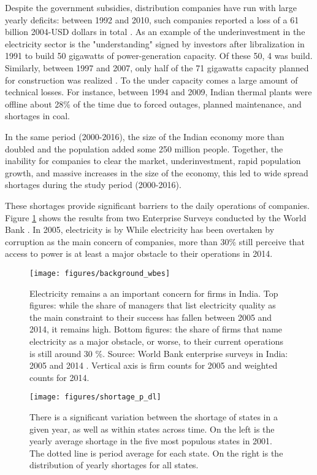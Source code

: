 \documentclass[11pt]{article}
\begin{document}
Despite the government subsidies, distribution companies have run with large yearly deficits: between 1992 and 2010, such companies reported a loss of a 61 billion 2004-USD dollars in total \citep{allcott_how_2016}. As an example of the underinvestment in the electricity sector is the "understanding" signed by investors after libralization in 1991 to build 50 gigawatts of power-generation capacity. Of these 50, 4 was build. Similarly, between 1997 and 2007, only half of the 71 gigawatts capacity planned for construction was realized \citep{cea_planwise_2013}. To the under capacity comes a large amount of technical losses. For instance, between 1994 and 2009, Indian thermal plants were offline about 28\% of the time due to forced outages, planned maintenance, and shortages in coal. 

In the same period (2000-2016), the size of the Indian economy more than doubled and the population added some 250 million people. Together, the inability for companies to clear the market, underinvestment, rapid population growth, and massive increases in the size of the economy, this led to wide spread shortages during the study period (2000-2016). 

These shortages provide significant barriers to the daily operations of companies. Figure \ref{fig:biggest_obstacle} shows the results from two Enterprise Surveys conducted by the World Bank \citep{world_bank_enterprise_2020-1,world_bank_enterprise_2020-2}. In 2005, electricity is by  While electricity has been overtaken by corruption as the main concern of companies, more than 30\% still perceive that access to power is at least a major obstacle to their operations in 2014.

\begin{figure}[htpb]
	\centering
	\texttt{[image: figures/background\_wbes]}
	\caption{Electricity remains a an important concern for firms in India. Top figures: while the share of managers that list electricity quality as the main constraint to their success has fallen between 2005 and 2014, it remains high. Bottom figures: the share of firms that name electricity as a major obstacle, or worse, to their current operations is still around 30 \%. Source: World Bank enterprise surveys in India: 2005 and 2014 \citep{world_bank_enterprise_2020-2,world_bank_enterprise_2020-1}. Vertical axis is firm counts for 2005 and weighted counts for 2014.}
	\label{fig:biggest_obstacle}
\end{figure}

\begin{figure}[htpb]
	\centering
	\label{fig:shortage_p_dl}
	\texttt{[image: figures/shortage\_p\_dl]}
	\caption{There is a significant variation between the shortage of states in a given year, as well as within states across time. On the left is the yearly average shortage in the five most populous states in 2001. The dotted line is period average for each state. On the right is the distribution of yearly shortages for all states.}%
	\label{fig:shortage_dist}
\end{figure}
\end{document}
